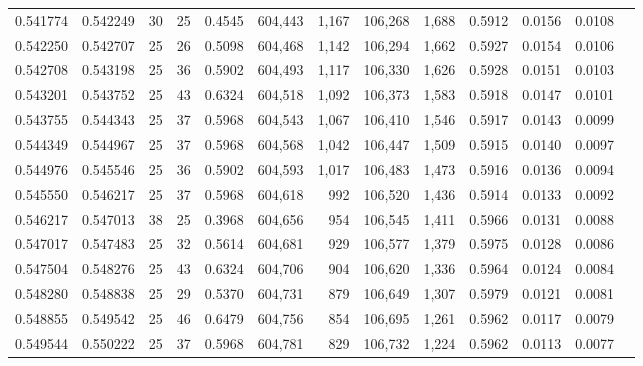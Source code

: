 \begin{tabular}{rrrrrrrrrrrrr}
0.541774 & 0.542249 &    30 &  25 &                                     0.4545 & 604,443 &   1,167 & 106,268 &   1,688 & 0.5912 & 0.0156 & 0.0108 \\
0.542250 & 0.542707 &    25 &  26 &                                     0.5098 & 604,468 &   1,142 & 106,294 &   1,662 & 0.5927 & 0.0154 & 0.0106 \\
0.542708 & 0.543198 &    25 &  36 &                                     0.5902 & 604,493 &   1,117 & 106,330 &   1,626 & 0.5928 & 0.0151 & 0.0103 \\
0.543201 & 0.543752 &    25 &  43 &                                     0.6324 & 604,518 &   1,092 & 106,373 &   1,583 & 0.5918 & 0.0147 & 0.0101 \\
0.543755 & 0.544343 &    25 &  37 &                                     0.5968 & 604,543 &   1,067 & 106,410 &   1,546 & 0.5917 & 0.0143 & 0.0099 \\
0.544349 & 0.544967 &    25 &  37 &                                     0.5968 & 604,568 &   1,042 & 106,447 &   1,509 & 0.5915 & 0.0140 & 0.0097 \\
0.544976 & 0.545546 &    25 &  36 &                                     0.5902 & 604,593 &   1,017 & 106,483 &   1,473 & 0.5916 & 0.0136 & 0.0094 \\
0.545550 & 0.546217 &    25 &  37 &                                     0.5968 & 604,618 &     992 & 106,520 &   1,436 & 0.5914 & 0.0133 & 0.0092 \\
0.546217 & 0.547013 &    38 &  25 &                                     0.3968 & 604,656 &     954 & 106,545 &   1,411 & 0.5966 & 0.0131 & 0.0088 \\
0.547017 & 0.547483 &    25 &  32 &                                     0.5614 & 604,681 &     929 & 106,577 &   1,379 & 0.5975 & 0.0128 & 0.0086 \\
0.547504 & 0.548276 &    25 &  43 &                                     0.6324 & 604,706 &     904 & 106,620 &   1,336 & 0.5964 & 0.0124 & 0.0084 \\
0.548280 & 0.548838 &    25 &  29 &                                     0.5370 & 604,731 &     879 & 106,649 &   1,307 & 0.5979 & 0.0121 & 0.0081 \\
0.548855 & 0.549542 &    25 &  46 &                                     0.6479 & 604,756 &     854 & 106,695 &   1,261 & 0.5962 & 0.0117 & 0.0079 \\
0.549544 & 0.550222 &    25 &  37 &                                     0.5968 & 604,781 &     829 & 106,732 &   1,224 & 0.5962 & 0.0113 & 0.0077 \\

\end{tabular}
